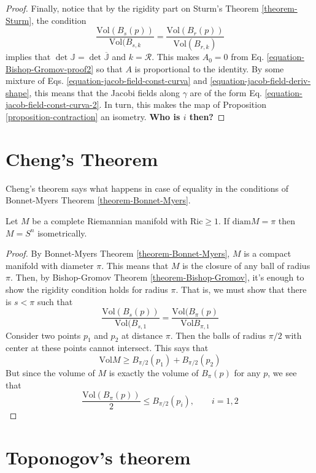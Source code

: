 \documentclass{book}
\begin{document}
\begin{proof}
Finally, notice that by the rigidity part on
Sturm's Theorem
\ref{theorem-Sturm}, the condition
$$
\frac{\text{Vol}(B_s(p))}{\text{Vol}(B_{s,k}}
=
\frac{\text{Vol}(B_r(p))}{\text{Vol}(B_{r,k})
}
$$
implies that
$\det\mathbb{J}=\det\overline{\mathbb{J}}$
and $k=\mathcal{R}$.
This makes $A_0=0$ from Eq.
\ref{equation-Bishop-Gromov-proof2} so that
$A$ is
proportional to the identity. By some mixture
of Eqs.
\ref{equation-jacob-field-const-curva}
and
\ref{equation-jacob-field-deriv-shape}, this
means that the
Jacobi fields along $\gamma$ are of the form
Eq.
\ref{equation-jacob-field-const-curva-2}. In
turn, this makes the map
of Proposition \ref{proposition-contraction}
an isometry. {\bf Who is $i$ then?}
\end{proof}

\section{Cheng's Theorem}
\label{section-Cheng-theorem}

Cheng's theorem says what happens in case of
equality in the conditions of
Bonnet-Myers Theorem
\ref{theorem-Bonnet-Myers}.
\begin{theorem}[Cheng]
\label{theorem-Cheng}
Let $M$ be a complete Riemannian manifold
with $\text{Ric}\geq 1$. If
$\text{diam}M=\pi$ then $M=S^n$
isometrically.
\end{theorem}

\begin{proof}
By Bonnet-Myers Theorem
\ref{theorem-Bonnet-Myers}, $M$ is a compact
manifold
with diameter $\pi$. This means that $M$ is
the closure of any ball of radius
$\pi$. Then, by Bishop-Gromov Theorem
\ref{theorem-Bishop-Gromov}, it's enough
to show the rigidity condition holds for
radius $\pi$. That is, we must show
that there is $s<\pi$ such that
$$
\frac{\text{Vol}(B_s(p))}{\text{Vol}(B_{s,1}}
=
\frac{\text{Vol}(B_\pi(p)}{\text{Vol}B_{\pi,
1}}
$$
Consider two points $p_1$ and $p_2$ at
distance $\pi$. Then the balls of radius
$\pi/2$ with center at these points cannot
intersect. This says that
$$
\text{Vol}M\geq B_{\pi/2}(p_1)+B_{\pi/2}(p_2)
$$
But since the volume of $M$ is exactly the
volume of $B_\pi(p)$ for any $p$, we
see that
$$
\frac{\text{Vol}(B_\pi(p))}{2}\leq
B_{\pi/2}(p_i),\qquad i=1,2
$$
\end{proof}

\section{Toponogov's theorem}
\label{section-Toponogov}
\end{document}
